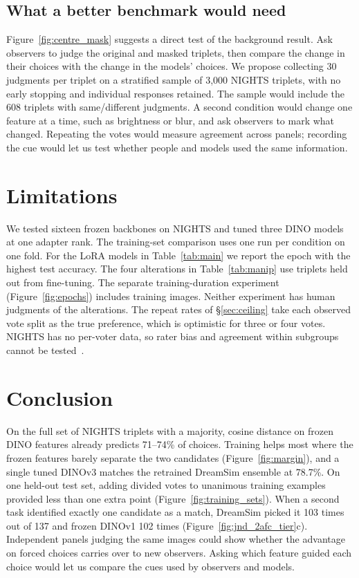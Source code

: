 \documentclass{article}
\begin{document}
\subsection{What a better benchmark would need}
\label{sec:protocol}

Figure~\ref{fig:centre_mask} suggests a direct test of the background result. Ask observers to judge the original and masked triplets, then compare the change in their choices with the change in the models' choices. We propose collecting 30 judgments per triplet on a stratified sample of 3{,}000 NIGHTS triplets, with no early stopping and individual responses retained. The sample would include the 608 triplets with same/different judgments. A second condition would change one feature at a time, such as brightness or blur, and ask observers to mark what changed. Repeating the votes would measure agreement across panels; recording the cue would let us test whether people and models used the same information.

\section{Limitations}
\label{sec:limitations}

We tested sixteen frozen backbones on NIGHTS and tuned three DINO models at one adapter rank. The training-set comparison uses one run per condition on one fold. For the LoRA models in Table~\ref{tab:main} we report the epoch with the highest test accuracy. The four alterations in Table~\ref{tab:manip} use triplets held out from fine-tuning. The separate training-duration experiment (Figure~\ref{fig:epochs}) includes training images. Neither experiment has human judgments of the alterations. The repeat rates of \S\ref{sec:ceiling} take each observed vote split as the true preference, which is optimistic for three or four votes. NIGHTS has no per-voter data, so rater bias and agreement within subgroups cannot be tested~\citep{henrich2010weirdest}.

\section{Conclusion}
\label{sec:conclusion}

On the full set of NIGHTS triplets with a majority, cosine distance on frozen DINO features already predicts 71--74\% of choices. Training helps most where the frozen features barely separate the two candidates (Figure~\ref{fig:margin}), and a single tuned DINOv3 matches the retrained DreamSim ensemble at 78.7\%. On one held-out test set, adding divided votes to unanimous training examples provided less than one extra point (Figure~\ref{fig:training_sets}). When a second task identified exactly one candidate as a match, DreamSim picked it 103 times out of 137 and frozen DINOv1 102 times (Figure~\ref{fig:jnd_2afc_tier}c). Independent panels judging the same images could show whether the advantage on forced choices carries over to new observers. Asking which feature guided each choice would let us compare the cues used by observers and models.
\end{document}
